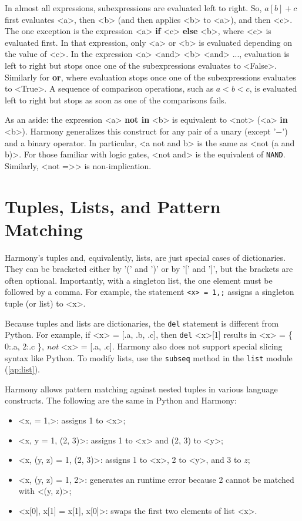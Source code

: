 \documentclass{report}
\begin{document}
In almost all expressions, subexpressions are evaluated left to right.
So, $a[b] + c$
first evaluates <{a}>, then <{b}> (and then applies <{b}> to <{a}>), and then <{c}>.  The one
exception is the expression <{a}> \textbf{if} <{c}> \textbf{else} <{b}>, where <{c}> is evaluated
first.  In that expression, only <{a}> or <{b}> is evaluated depending on the value of <{c}>.
In the expression <{a}> <{and}> <{b}> <{and}> $...$, evaluation is left
to right but stops once one of the subexpressions evaluates to <{False}>.
Similarly for \textbf{or}, where evaluation stops once one of the subexpressions
evaluates to <{True}>.
A sequence of comparison operations, such as $a < b < c$, is evaluated left to right
but stops as soon as one of the comparisons fails.

As an aside:
the expression <{a}> \textbf{not in} <{b}> is equivalent to <{not}> (<{a}> \textbf{in} <{b}>).
Harmony generalizes this construct for any pair of a unary (except '$-$') and a binary operator.
In particular, <{a not and b}> is the same as <{not (a and b)}>.  
For those familiar with logic gates, <{not and}> is the equivalent of \texttt{NAND}.
Similarly, <{not =>}> is non-implication.

\section{Tuples, Lists, and Pattern Matching}

Harmony's tuples and, equivalently, lists, are just special cases of dictionaries.
They can be bracketed either by '(' and ')' or by '[' and ']', but
the brackets are often optional.  Importantly, with a singleton list, the
one element must be followed by a comma.
For example, the statement \texttt{<{x}> = 1,;} assigns a singleton tuple (or list) to <{x}>.

Because tuples and lists are dictionaries, the \texttt{del} statement is
different from Python.  For example, if <{x}> = [.a, .b, .c], then
\texttt{del} <{x}>[1] results in <{x}> = \{ 0:.a, 2:.c \}, \emph{not}
<{x}> = [.a, .c].
Harmony also does not support special slicing syntax like Python.
To modify lists, use the \texttt{subseq} method in the \texttt{list} module
(\autoref{ap:list}).

Harmony allows pattern matching against nested tuples in various
language constructs.
%
The following are the same in Python and Harmony:
\begin{itemize}
\item <{x, = 1,}>: assigns 1 to <{x}>;
\item <{x, y = 1, (2, 3)}>: assigns 1 to <{x}> and (2, 3) to <{y}>;
\item <{x, (y, z) = 1, (2, 3)}>: assigns 1 to <{x}>, 2 to <{y}>, and
3 to $z$;
\item <{x, (y, z) = 1, 2}>: generates an runtime error because 2 cannot
be matched with <{(y, z)}>;
\item <{x[0], x[1] = x[1], x[0]}>: swaps the first two elements of list <{x}>.
\end{itemize}
\end{document}
